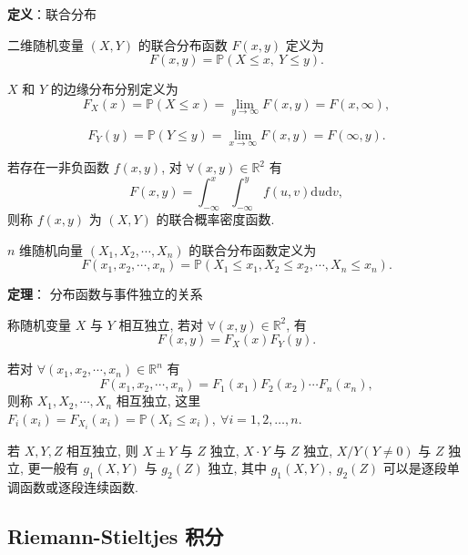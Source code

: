 \documentclass[openany]{ctexbook}
\theoremstyle{kaiti}
\theoremstyle{normal}
\begin{document}
\textbf{定义}：联合分布

二维随机变量 $(X,Y)$ 的联合分布函数 $F(x,y)$ 定义为
\begin{equation}
  F(x,y)=\mathbb{P}(X\leqslant x,~Y\leqslant y).
\end{equation}
 

$X$ 和 $Y$ 的边缘分布分别定义为 
\begin{equation}
  F_X(x)= \mathbb{P}(X\leqslant x)= \lim_{y\to\infty} F(x, y)=F(x,\infty),
\end{equation} 

\begin{equation}
  F_Y(y)= \mathbb{P}(Y\leqslant y)= \lim_{x\to\infty} F(x, y)=F(\infty,y).
\end{equation} 

若存在一非负函数 $f(x,y)$, 对 $\forall(x,y)\in\mathbb{R}^2$ 有
\begin{equation}
  F(x,y)=\int_{-\infty}^x\int_{-\infty}^yf(u,v)\mathrm{d}u\mathrm{d}v,
\end{equation}
则称 $f(x,y)$ 为 $(X,Y)$ 的联合概率密度函数.

$n$ 维随机向量 $(X_1,X_2,\cdots,X_n)$ 的联合分布函数定义为
\begin{equation}
  F(x_1,x_2,\cdots,x_n)=\mathbb{P}(X_1\leqslant x_1,X_2\leqslant x_2,\cdots,X_n\leqslant x_n).
\end{equation}

\textbf{定理}： 分布函数与事件独立的关系

称随机变量 $X$ 与 $Y$ 相互独立, 若对 $\forall(x,y)\in\mathbb{R}^2$, 有
\begin{equation}
  F(x, y)=F_X(x)F_Y(y).
\end{equation}

若对 $\forall(x_1,x_2,\cdots,x_n)\in\mathbb{R}^n$ 有
\begin{equation}
  F(x_1,x_2,\cdots,x_n)=F_1(x_1)F_2(x_2)\cdots F_n(x_n),
\end{equation}
则称 $X_1,X_2,\cdots,X_n$ 相互独立, 这里 $F_i(x_i)=F_{X_i}(x_i)=\mathbb{P}(X_i\leqslant x_i),~\forall i=1,2,\ldots,n$.

若 $X,Y,Z$ 相互独立, 则 $X\pm Y$ 与 $Z$ 独立, $X\cdot Y$ 与 $Z$ 独立, $X/Y(Y\neq0)$ 与 $Z$ 独立, 更一般有 $g_1(X,Y)$ 与 $g_2(Z)$ 独立, 其中 $g_1(X,Y),~g_2(Z)$ 可以是逐段单调函数或逐段连续函数.

\subsection{Riemann-Stieltjes 积分}
\end{document}
